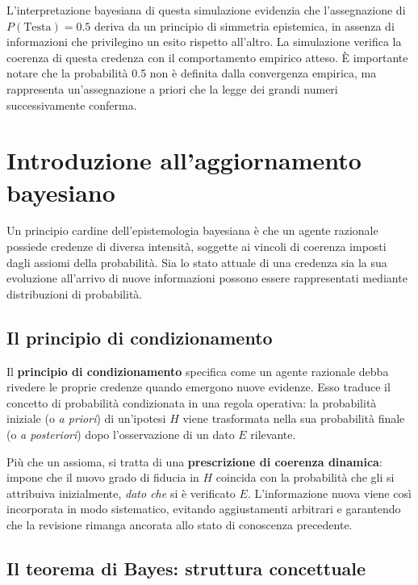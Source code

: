 \documentclass[
  italian,
  letterpaper,
  a4paper,
  11pt,
  open=any]{scrbook}
\theoremstyle{plain}
\theoremstyle{definition}
\theoremstyle{definition}
\theoremstyle{remark}
\begin{document}
L'interpretazione bayesiana di questa simulazione evidenzia che
l'assegnazione di \(P(\text{Testa}) = 0.5\) deriva da un principio di
simmetria epistemica, in assenza di informazioni che privilegino un
esito rispetto all'altro. La simulazione verifica la coerenza di questa
credenza con il comportamento empirico atteso. È importante notare che
la probabilità 0.5 non è definita dalla convergenza empirica, ma
rappresenta un'assegnazione a priori che la legge dei grandi numeri
successivamente conferma.

\section{Introduzione all'aggiornamento
bayesiano}\label{introduzione-allaggiornamento-bayesiano}

Un principio cardine dell'epistemologia bayesiana è che un agente
razionale possiede credenze di diversa intensità, soggette ai vincoli di
coerenza imposti dagli assiomi della probabilità. Sia lo stato attuale
di una credenza sia la sua evoluzione all'arrivo di nuove informazioni
possono essere rappresentati mediante distribuzioni di probabilità.

\subsection{Il principio di
condizionamento}\label{il-principio-di-condizionamento}

Il \textbf{principio di condizionamento} specifica come un agente
razionale debba rivedere le proprie credenze quando emergono nuove
evidenze. Esso traduce il concetto di probabilità condizionata in una
regola operativa: la probabilità iniziale (o \emph{a priori}) di
un'ipotesi \(H\) viene trasformata nella sua probabilità finale (o
\emph{a posteriori}) dopo l'osservazione di un dato \(E\) rilevante.

Più che un assioma, si tratta di una \textbf{prescrizione di coerenza
dinamica}: impone che il nuovo grado di fiducia in \(H\) coincida con la
probabilità che gli si attribuiva inizialmente, \emph{dato che} si è
verificato \(E\). L'informazione nuova viene così incorporata in modo
sistematico, evitando aggiustamenti arbitrari e garantendo che la
revisione rimanga ancorata allo stato di conoscenza precedente.

\subsection{Il teorema di Bayes: struttura
concettuale}\label{il-teorema-di-bayes-struttura-concettuale}
\end{document}
